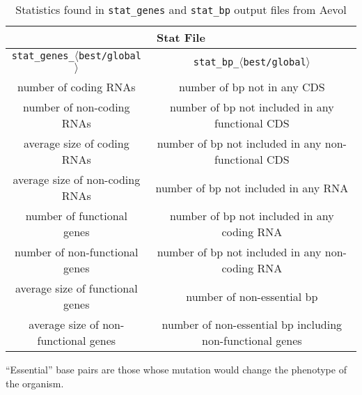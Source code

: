 \begin{table}[H]
	\centering
	\begin{tabular}{ |c|c| }
		\hline
		\multicolumn{2}{|c|}{\textbf{Stat File}} \\
		\hline
		\texttt{stat\_genes\_}$\langle$\texttt{best/global}$\rangle$ & \texttt{stat\_bp\_}$\langle$\texttt{best/global}$\rangle$ \\
		\hline \hline
		number of coding RNAs & number of bp not in any CDS \\
		\hline
		number of non-coding RNAs & number of bp not included in any functional CDS \\
		\hline
		average size of coding RNAs & number of bp not included in any non-functional CDS \\
		\hline
		average size of non-coding RNAs & number of bp not included in any RNA \\
		\hline
		number of functional genes & number of bp not included in any coding RNA \\
		\hline
		number of non-functional genes & number of bp not included in any non-coding RNA \\
		\hline
		average size of functional genes & number of non-essential bp \\
		\hline
		average size of non-functional genes & number of non-essential bp including non-functional genes \\
		\hline
	\end{tabular}
	\caption[Aevol's stats: genes and base pairs]{Statistics found in \texttt{stat\_genes} and \texttt{stat\_bp} output files from Aevol}
	\label{table:aevol_stats_genes_and_bp}
\end{table}
``Essential'' base pairs are those whose mutation would change the phenotype of the organism.
